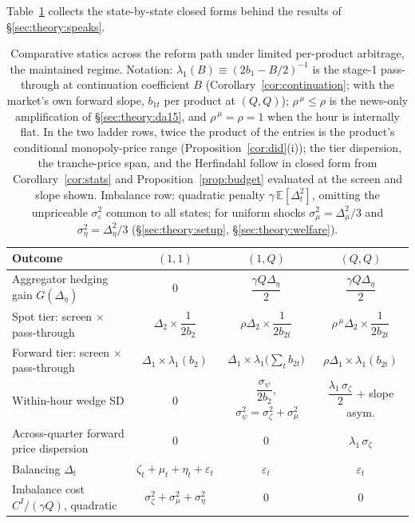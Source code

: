 \documentclass[11pt,a4paper]{article}
\theoremstyle{definition}
\theoremstyle{remark}
\theoremstyle{plain}
\begin{document}
Table~\ref{tab:comparative} collects the state-by-state closed forms behind the results of \S\ref{sec:theory:speaks}.

\begin{table}[h]
\centering
\footnotesize
\caption{Comparative statics across the reform path under limited per-product arbitrage, the maintained regime. Notation: $\lambda_1(B) \equiv (2 b_1 - B/2)^{-1}$ is the stage-1 pass-through at continuation coefficient $B$ (Corollary~\ref{cor:continuation}; with the market's own forward slope, $b_{1t}$ per product at $(Q,Q)$); $\rho^{\,\mu} \le \rho$ is the news-only amplification of \S\ref{sec:theory:da15}, and $\rho^{\,\mu} = \rho = 1$ when the hour is internally flat. In the two ladder rows, twice the product of the entries is the product's conditional monopoly-price range (Proposition~\ref{cor:did}(i)); the tier dispersion, the tranche-price span, and the Herfindahl follow in closed form from Corollary~\ref{cor:stats} and Proposition~\ref{prop:budget} evaluated at the screen and slope shown. Imbalance row: quadratic penalty $\gamma\,\mathbb{E}[\Delta_t^2]$, omitting the unpriceable $\sigma_\varepsilon^2$ common to all states; for uniform shocks $\sigma_\mu^2 = \Delta_\mu^2/3$ and $\sigma_\eta^2 = \Delta_\eta^2/3$ (\S\ref{sec:theory:setup}, \S\ref{sec:theory:welfare}).}
\label{tab:comparative}
\begin{tabular}{p{4.6cm} c c c}
\toprule
Outcome & $(1,1)$ & $(1,Q)$ & $(Q,Q)$ \\
\midrule
Aggregator hedging gain $G(\Delta_\eta)$
 & $0$
 & $\dfrac{\gamma Q \Delta_\eta}{2}$
 & $\dfrac{\gamma Q \Delta_\eta}{2}$ \\
Spot tier: screen $\times$ pass-through
 & $\Delta_2 \times \dfrac{1}{2 b_2}$
 & $\rho\Delta_2 \times \dfrac{1}{2 b_{2t}}$
 & $\rho^{\,\mu}\Delta_2 \times \dfrac{1}{2 b_{2t}}$ \\
Forward tier: screen $\times$ pass-through
 & $\Delta_1 \times \lambda_1(b_2)$
 & $\Delta_1 \times \lambda_1\bigl(\textstyle\sum_t b_{2t}\bigr)$
 & $\rho\Delta_1 \times \lambda_1(b_{2t})$ \\
Within-hour wedge SD
 & $0$
 & $\dfrac{\sigma_\psi}{2 b_2}$, $\ \sigma_\psi^2 = \sigma_\zeta^2+\sigma_\mu^2$
 & $\dfrac{\lambda_1\, \sigma_\zeta}{2}$ + slope asym. \\
Across-quarter forward price dispersion
 & $0$
 & $0$
 & $\lambda_1\, \sigma_\zeta$ \\
Balancing $\Delta_t$
 & $\zeta_t+\mu_t+\eta_t+\varepsilon_t$
 & $\varepsilon_t$
 & $\varepsilon_t$ \\
Imbalance cost $C^I/(\gamma Q)$, quadratic
 & $\sigma_\zeta^2+\sigma_\mu^2+\sigma_\eta^2$
 & $0$
 & $0$ \\
\bottomrule
\end{tabular}
\end{table}
\end{document}
